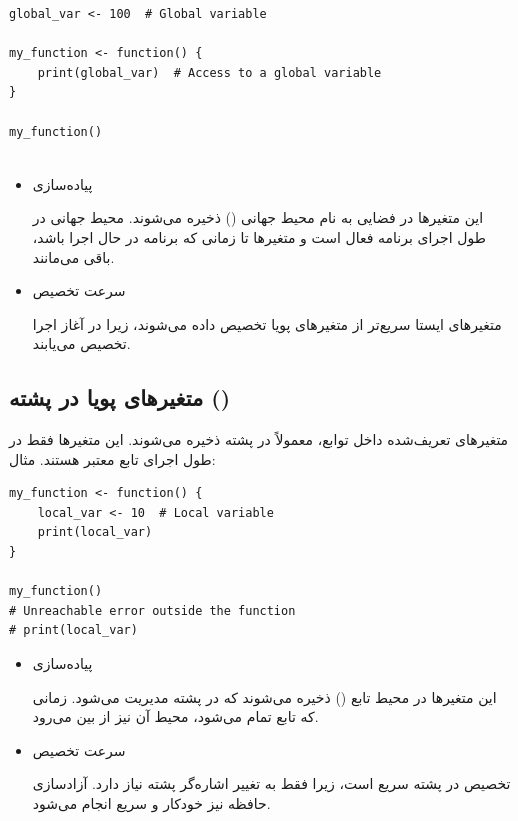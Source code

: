 \documentclass[11pt, a4paper, oneside]{book}
\begin{document}
					\begin{latin}
						\begin{lstlisting}[caption={\lr{Static variables}}] 
global_var <- 100  # Global variable

my_function <- function() {
	print(global_var)  # Access to a global variable
}

my_function()
		
						\end{lstlisting}
					\end{latin}
					
					\begin{itemize}
						
						\item 
						{\large پیاده‌سازی}
						
						
						این متغیرها در فضایی به نام محیط جهانی () ذخیره می‌شوند.
						محیط جهانی در طول اجرای برنامه فعال است و متغیرها تا زمانی که برنامه در حال اجرا باشد، باقی می‌مانند.
						
						\item 
						{\large سرعت تخصیص}
						
						
						متغیرهای ایستا سریع‌تر از متغیرهای پویا تخصیص داده می‌شوند، زیرا در آغاز اجرا تخصیص می‌یابند.
						
					\end{itemize}
			
			\subsection{متغیرهای پویا در پشته ()}
				
				متغیرهای تعریف‌شده داخل توابع، معمولاً در پشته ذخیره می‌شوند. این متغیرها فقط در طول اجرای تابع معتبر هستند. مثال:
					
					\begin{latin}
						\begin{lstlisting}[caption={\lr{Dynamic stack variables}}] 
my_function <- function() {
	local_var <- 10  # Local variable
	print(local_var)
}

my_function()
# Unreachable error outside the function
# print(local_var)

						\end{lstlisting}
					\end{latin}
					
					\begin{itemize}
					
					\item 
					{\large پیاده‌سازی}
					
					
					این متغیرها در محیط تابع () ذخیره می‌شوند که در پشته مدیریت می‌شود.
					زمانی که تابع تمام می‌شود، محیط آن نیز از بین می‌رود.
					
					
					\item 
					{\large سرعت تخصیص}
					
					
					تخصیص در پشته سریع است، زیرا فقط به تغییر اشاره‌گر پشته نیاز دارد.
					آزادسازی حافظه نیز خودکار و سریع انجام می‌شود.
					
					\end{itemize}
				
\end{document}
